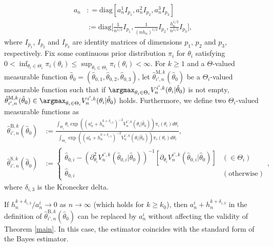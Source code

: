 \documentclass[a4paper,11pt]{jsarticle}
\begin{document}
\begin{align}
    a_n & :  = \text{diag}[a_n^1 I_{p_1} ,a_n^2 I_{p_2},a_n^3 I_{p_3} ] \\ & :=\text{diag} \Big[\frac{1}{n^{1/2}} I_{p_1} , \frac{1}{(nh_n)^{1/2}} I_{p_2}, \frac{h_n^{1/2}}{n^{1/2}}  I_{p_3} \Big],
\end{align}
where $I_{p_1}$, $I_{p_2}$ and $I_{p_3}$ are identity matrices of dimensions $p_1$, $p_2$ and $p_3$, respectively. Fix some continuous prior distribution ${\pi}_i $ for $\theta_i$ satisfying  $0 < \inf_{\theta_i \in \Theta_i} \pi_i(\theta_i) \leq \sup_{\theta_i \in \Theta_i} \pi_i(\theta_i)<\infty$. For $k \geq 1$ and a $\Theta$-valued measurable function $\hat{\theta}_0  = (\hat{\theta}_{0,1} , \hat{\theta}_{0,2},\hat{\theta}_{0,3}) $, let $\hat{\theta}_{i',n}^{\text{M},k}(\hat{\theta}_0)$ be a $\Theta_i$-valued measurable function such that if $\argmax_{\theta_i \in \Theta_i} V_n^{i',k}(\theta_i | \hat{\theta}_0)$ is not empty, $\hat{\theta}_{i',n}^{\text{M},k}(\hat{\theta}_0) \in \argmax_{\theta_i \in \Theta_i} V_n^{i',k}(\theta_i | \hat{\theta}_0)$ holds. Furthermore, we define two $\Theta_i$-valued measurable functions as
\begin{align}
      
      \hat{\theta}_{i',n} ^{\text{B},k}(\hat{\theta}_0) &:= \frac{\int_{\Theta_i} \theta_i \exp( (a_n^i + h_n^{k + \delta_{i,3} }) ^{-2} V_n^{i',k}(\theta_i| \hat{\theta}_0)) \pi_{i}(\theta_i) d\theta_i }{\int_{\Theta_i} \exp( (a_n^i + h_n^{k + \delta_{i,3} }) ^{-2}V_n^{i',k}(\theta_i| \hat{\theta}_0)) \pi_{i}(\theta_i) d\theta_i}, \\  \hat{\theta}_{i',n} ^{\text{S},k}(\hat{\theta}_0) &:=  \begin{cases}
            \hat{\theta}_{0,i} - (\partial_{\theta_i}^2 V_n^ {i',k}(\hat{\theta}_{0,i}|\hat{\theta}_0))^{-1}[\partial_{\theta_i} V_n^{i',k}(\hat{\theta}_{0,i}|\hat{\theta}_0) ] & (\in \Theta_i) \\ \hat{\theta}_{0,i} & (\text{otherwise})
        \end{cases},
\end{align}
where $\delta_{i,3} $ is the Kronecker delta. 
\color{black}
\begin{remark}
If $h_n^{k + \delta_{i,3} }/a_n^i  \to 0$ as $n \to \infty$ (which holds for $k \geq k_0$), then $a_n^i + h_n^{k + \delta_{i,3} }$ in the definition of $\hat{\theta}_{i',n} ^{\text{B},k}(\hat{\theta}_0)$ can be replaced by $a_n^i$ without affecting the validity of Theorem \ref{main}. In this case, the estimator coincides with the standard form of the Bayes estimator.
\end{remark}
\end{document}
